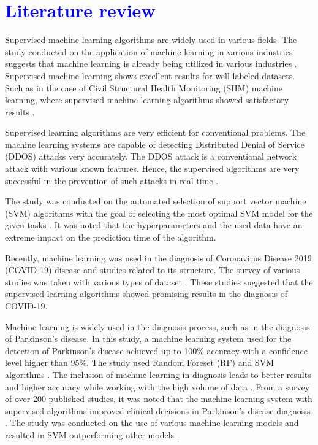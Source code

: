 \documentclass[a4paper,fleqn]{cas-dc}
\newcommand{\responsemod}{\color{blue}}
\newcommand{\responsemodsm}[1]{\textcolor{blue}{#1}}
\newcommand{\sectionb}[1]{\section{\responsemodsm{#1}}}
\begin{document}
\sectionb{Literature review}\label{sec:literature_review}

{\responsemod
Supervised machine learning algorithms are widely used in various fields. The study conducted on the application of machine learning in various industries suggests that machine learning is already being utilized in various industries \cite{ref_paper_14}. Supervised machine learning shows excellent results for well-labeled datasets. Such as in the case of Civil Structural Health Monitoring (SHM) machine learning, where supervised machine learning algorithms showed satisfactory results \cite{ref_paper_6}.

    Supervised learning algorithms are very efficient for conventional problems. The machine learning systems are capable of detecting Distributed Denial of Service (DDOS) attacks very accurately. The DDOS attack is a conventional network attack with various known features. Hence, the supervised algorithms are very successful in the prevention of such attacks in real time \cite{ref_paper_9}.
    
    The study was conducted on the automated selection of support vector machine (SVM) algorithms with the goal of selecting the most optimal SVM model for the given tasks \cite{ref_paper_2}. It was noted that the hyperparameters and the used data have an extreme impact on the prediction time of the algorithm.
    
    Recently, machine learning was used in the diagnosis of Coronavirus Disease 2019 (COVID-19) disease and studies related to its structure. The survey of various studies was taken with various types of dataset \cite{ref_paper_20}. These studies suggested that the supervised learning algorithms showed promising results in the diagnosis of COVID-19.
    
    Machine learning is widely used in the diagnosis process, such as in the diagnosis of Parkinson's disease. In this study, a machine learning system used for the detection of Parkinson's disease achieved up to 100\% accuracy with a confidence level higher than 95\%. The study used Random Foreset (RF) and SVM algorithms \cite{ref_paper_34}. The inclusion of machine learning in diagnosis leads to better results and higher accuracy while working with the high volume of data \cite{ref_paper_15}. From a survey of over 200 published studies, it was noted that the machine learning system with supervised algorithms improved clinical decisions in Parkinson's disease diagnosis \cite{ref_paper_27}. The study was conducted on the use of various machine learning models and resulted in SVM outperforming other models \cite{ref_paper_30}.
    
}
\end{document}
